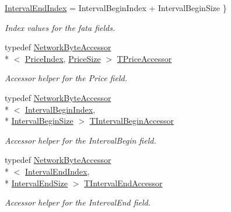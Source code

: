 \begin{DoxyCompactItemize}
\hyperlink{class_terra_swarm_1_1_synchronous_1_1_set_current_price_a1e2f6ce793cf79b121b76b6903e9df58a2a78676d8ac8e4de4e131d71736f086c}{Interval\-End\-Index} = Interval\-Begin\-Index + Interval\-Begin\-Size
 \}
\begin{DoxyCompactList}\small\item\em Index values for the fata fields. \end{DoxyCompactList}\item 
typedef \hyperlink{class_terra_swarm_1_1_network_byte_accessor}{Network\-Byte\-Accessor}\\*
$<$ \hyperlink{class_terra_swarm_1_1_synchronous_1_1_set_current_price_a1e2f6ce793cf79b121b76b6903e9df58a5885a64cfebb23b330bc57406aeca87c}{Price\-Index}, \hyperlink{class_terra_swarm_1_1_synchronous_1_1_set_current_price_a8e183f6b467bff2559f766835197fb5da6d42507cf32e815416954a4126721a75}{Price\-Size} $>$ \hyperlink{class_terra_swarm_1_1_synchronous_1_1_set_current_price_a950c013f39e20f890173e81a716e3b6b}{T\-Price\-Accessor}
\begin{DoxyCompactList}\small\item\em Accessor helper for the Price field. \end{DoxyCompactList}\item 
typedef \hyperlink{class_terra_swarm_1_1_network_byte_accessor}{Network\-Byte\-Accessor}\\*
$<$ \hyperlink{class_terra_swarm_1_1_synchronous_1_1_set_current_price_a1e2f6ce793cf79b121b76b6903e9df58ad2470cb4012d8a03a476f2c0a7ed837d}{Interval\-Begin\-Index}, \\*
\hyperlink{class_terra_swarm_1_1_synchronous_1_1_set_current_price_a8e183f6b467bff2559f766835197fb5da53a8281758edfad40d43fba9a81dc5c5}{Interval\-Begin\-Size} $>$ \hyperlink{class_terra_swarm_1_1_synchronous_1_1_set_current_price_a2d095e9cd5341bca06b121f115875bcc}{T\-Interval\-Begin\-Accessor}
\begin{DoxyCompactList}\small\item\em Accessor helper for the Interval\-Begin field. \end{DoxyCompactList}\item 
typedef \hyperlink{class_terra_swarm_1_1_network_byte_accessor}{Network\-Byte\-Accessor}\\*
$<$ \hyperlink{class_terra_swarm_1_1_synchronous_1_1_set_current_price_a1e2f6ce793cf79b121b76b6903e9df58a2a78676d8ac8e4de4e131d71736f086c}{Interval\-End\-Index}, \\*
\hyperlink{class_terra_swarm_1_1_synchronous_1_1_set_current_price_a8e183f6b467bff2559f766835197fb5da289d263a3891286fe193d5c69ad33691}{Interval\-End\-Size} $>$ \hyperlink{class_terra_swarm_1_1_synchronous_1_1_set_current_price_ada50db521ec8f4351b11c9e7a55191f6}{T\-Interval\-End\-Accessor}
\begin{DoxyCompactList}\small\item\em Accessor helper for the Interval\-End field. \end{DoxyCompactList}\end{DoxyCompactItemize}
